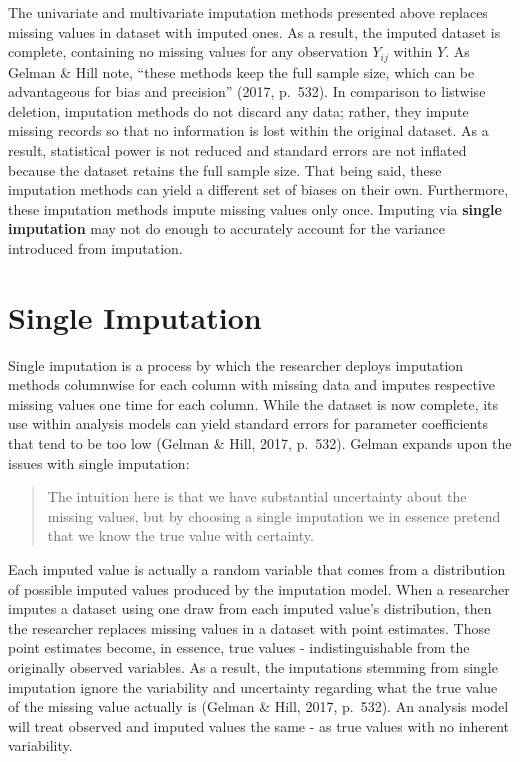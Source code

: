 \documentclass[12pt,oneside]{chicagocapstone}
\begin{document}
The univariate and multivariate imputation methods presented above
replaces missing values in dataset with imputed ones. As a result, the
imputed dataset is complete, containing no missing values for any
observation \(Y_{ij}\) within \(Y\). As Gelman \& Hill note, ``these
methods keep the full sample size, which can be advantageous for bias
and precision'' (2017, p.~532). In comparison to listwise deletion,
imputation methods do not discard any data; rather, they impute missing
records so that no information is lost within the original dataset. As a
result, statistical power is not reduced and standard errors are not
inflated because the dataset retains the full sample size. That being
said, these imputation methods can yield a different set of biases on
their own. Furthermore, these imputation methods impute missing values
only once. Imputing via \textbf{single imputation} may not do enough to
accurately account for the variance introduced from imputation.

\hypertarget{background-single-imputation}{\section*{Single
Imputation}\label{background-single-imputation}}

Single imputation is a process by which the researcher deploys
imputation methods columnwise for each column with missing data and
imputes respective missing values one time for each column. While the
dataset is now complete, its use within analysis models can yield
standard errors for parameter coefficients that tend to be too low
(Gelman \& Hill, 2017, p.~532). Gelman expands upon the issues with
single imputation:
\begin{quote}
The intuition here is that we have substantial uncertainty about the
missing values, but by choosing a single imputation we in essence
pretend that we know the true value with certainty.
\end{quote}
Each imputed value is actually a random variable that comes from a
distribution of possible imputed values produced by the imputation
model. When a researcher imputes a dataset using one draw from each
imputed value's distribution, then the researcher replaces missing
values in a dataset with point estimates. Those point estimates become,
in essence, true values - indistinguishable from the originally observed
variables. As a result, the imputations stemming from single imputation
ignore the variability and uncertainty regarding what the true value of
the missing value actually is (Gelman \& Hill, 2017, p.~532). An
analysis model will treat observed and imputed values the same - as true
values with no inherent variability.
\end{document}
